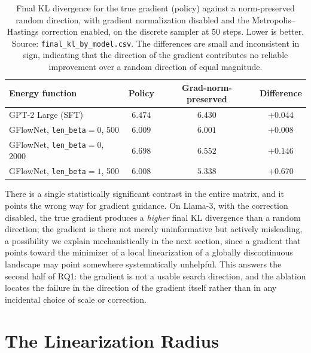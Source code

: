 \begin{table}[t]
    \centering
    \small
    \begin{tabular}{lccc}
        \toprule
        Energy function & Policy & Grad-norm-preserved & Difference \\
        \midrule
        GPT-2 Large (SFT) & $6.474$ & $6.430$ & $+0.044$ \\
        GFlowNet, \texttt{len\_beta}$=0$, 500 & $6.009$ & $6.001$ & $+0.008$ \\
        GFlowNet, \texttt{len\_beta}$=0$, 2000 & $6.698$ & $6.552$ & $+0.146$ \\
        GFlowNet, \texttt{len\_beta}$=1$, 500 & $6.008$ & $5.338$ & $+0.670$ \\
        \bottomrule
    \end{tabular}
    \caption{Final KL divergence for the true gradient (policy) against a norm-preserved random direction, with gradient normalization disabled and the Metropolis--Hastings correction enabled, on the discrete sampler at 50 steps. Lower is better. Source: \texttt{final\_kl\_by\_model.csv}. The differences are small and inconsistent in sign, indicating that the direction of the gradient contributes no reliable improvement over a random direction of equal magnitude.}
    \label{tab:fallacy}
\end{table}

There is a single statistically significant contrast in the entire matrix, and it points the wrong way for gradient guidance. On Llama-3, with the correction disabled, the true gradient produces a \emph{higher} final KL divergence than a random direction; the gradient is there not merely uninformative but actively misleading, a possibility we explain mechanistically in the next section, since a gradient that points toward the minimizer of a local linearization of a globally discontinuous landscape may point somewhere systematically unhelpful. This answers the second half of RQ1: the gradient is not a usable search direction, and the ablation locates the failure in the direction of the gradient itself rather than in any incidental choice of scale or correction.

\section{The Linearization Radius}
\label{sec:results-linradius}

